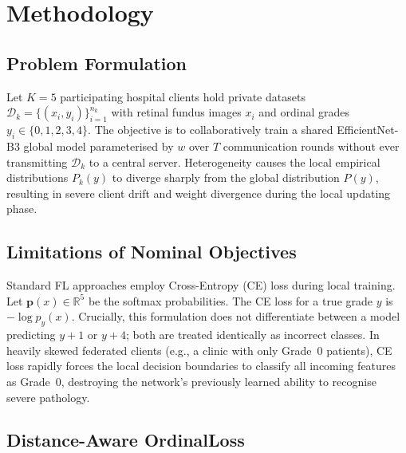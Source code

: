 \section{Methodology}
\label{sec:method}

\subsection{Problem Formulation}

Let $K = 5$ participating hospital clients hold private datasets
$\mathcal{D}_k = \{(x_i, y_i)\}_{i=1}^{n_k}$ with retinal fundus images $x_i$
and ordinal grades $y_i \in \{0, 1, 2, 3, 4\}$. The objective is to collaboratively
train a shared EfficientNet-B3 global model parameterised by $w$ over $T$
communication rounds without ever transmitting $\mathcal{D}_k$ to a central server.
Heterogeneity causes the local empirical distributions $P_k(y)$ to diverge sharply
from the global distribution $P(y)$, resulting in severe client drift and weight
divergence during the local updating phase.

\subsection{Limitations of Nominal Objectives}

Standard FL approaches employ Cross-Entropy (CE) loss during local training.
Let $\mathbf{p}(x) \in \mathbb{R}^5$ be the softmax probabilities. The CE loss for
a true grade $y$ is $-\log p_y(x)$. Crucially, this formulation does not differentiate
between a model predicting $y+1$ or $y+4$; both are treated identically as incorrect
classes. In heavily skewed federated clients (e.g., a clinic with only Grade~0 patients),
CE loss rapidly forces the local decision boundaries to classify all incoming features
as Grade~0, destroying the network's previously learned ability to recognise severe
pathology.

\subsection{Distance-Aware OrdinalLoss}

